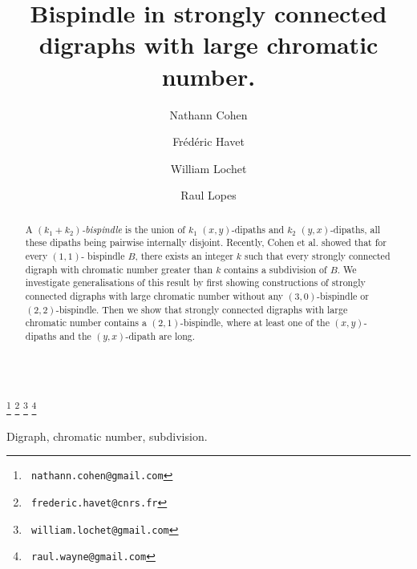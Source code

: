 \documentclass{endm}
\begin{document}
\begin{verbatim}\end{verbatim}\vspace{2.5cm}

\begin{frontmatter}

\title{Bispindle in strongly connected digraphs with large chromatic number.}

\author{Nathann Cohen}
\address{CNRS, LRI, Univ. Paris Sud, Orsay, France}

\author{Fr\'ed\'eric Havet}
\address{ Univ. C\^ote d'Azur, CNRS, I3S, INRIA, France}


\author{William Lochet}
\address{ Univ. C\^ote d'Azur, CNRS, I3S, INRIA, and LIP, ENS Lyon, France}

\author{Raul Lopes}
\address{Departamento de Computa\c{c}ao, Universidade Federal do Cear\'a, Fortaleza, Brazil}



   \thanks[mail1]{\texttt{\normalshape
  nathann.cohen@gmail.com}} 
  \thanks[mail2]{\texttt{\normalshape
  frederic.havet@cnrs.fr}} 
  \thanks[mail3]{\texttt{\normalshape
  william.lochet@gmail.com}}
  \thanks[mail4]{\texttt{\normalshape
  raul.wayne@gmail.com}}


\begin{abstract}
A {\it $(k_1+k_2)$-bispindle} is the union of $k_1$  $(x,y)$-dipaths and $k_2$ $(y,x)$-dipaths, all these dipaths being pairwise internally disjoint.
Recently, Cohen et al. showed that for every $(1,1)$- bispindle $B$, there exists an integer $k$ such that every strongly connected
digraph with chromatic number greater than $k$ contains a subdivision of $B$. We investigate generalisations of
this result by first showing constructions of strongly connected digraphs with large chromatic number without any $(3,0)$-bispindle
or $(2,2)$-bispindle. Then we show that strongly connected digraphs with large chromatic number contains a 
$(2,1)$-bispindle, where at least one of the $(x,y)$-dipaths and the $(y,x)$-dipath are long.    
\end{abstract}

\begin{keyword}
Digraph, chromatic number, subdivision.
\end{keyword}

\end{frontmatter}
\end{document}
